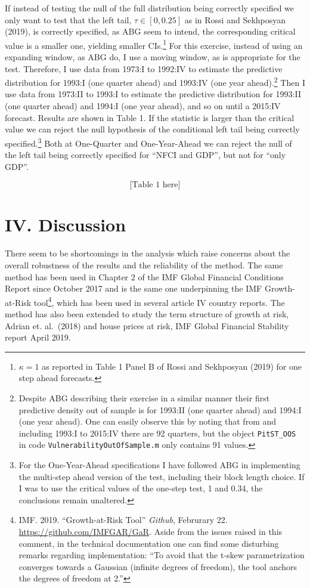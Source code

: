 \documentclass[
  11pt,
]{article}
\begin{document}
If instead of testing the null of the full distribution being correctly
specified we only want to test that the left tail,
\(\tau \in [0, 0.25]\) as in Rossi and Sekhposyan (2019), is correctly
specified, as ABG seem to intend, the corresponding critical value is a
smaller one, yielding smaller
CIs.\footnote{$\kappa = 1$  as reported in Table 1 Panel B of Rossi and Sekhposyan (2019) for one step ahead forecasts.}
For this exercise, instead of using an expanding window, as ABG do, I
use a moving window, as is appropriate for the test. Therefore, I use
data from 1973:I to 1992:IV to estimate the predictive distribution for
1993:I (one quarter ahead) and 1993:IV (one year
ahead).\footnote{Despite ABG describing their exercise in a similar manner their first predictive density out of sample is for 1993:II (one quarter ahead) and 1994:I (one year ahead). One can easily observe this by noting that from and including 1993:I to 2015:IV there are 92 quarters, but the object \texttt{PitST\_OOS} in code \texttt{VulnerabilityOutOfSample.m} only contains 91 values.}
Then I use data from 1973:II to 1993:I to estimate the predictive
distribution for 1993:II (one quarter ahead) and 1994:I (one year
ahead), and so on until a 2015:IV forecast. Results are shown in Table
1. If the statistic is larger than the critical value we can reject the
null hypothesis of the conditional left tail being correctly
specified.\footnote{For the One-Year-Ahead specifications I have followed ABG in implementing the multi-step ahead version of the test, including their block length choice. If I was to use the critical values of the one-step test, 1 and 0.34, the conclusions remain unaltered.}
Both at One-Quarter and One-Year-Ahead we can reject the null of the
left tail being correctly specified for ``NFCI and GDP'', but not for
``only GDP''.

\[
\text{[Table 1 here]}
\]

\hypertarget{iv.-discussion}{%
\section{IV. Discussion}\label{iv.-discussion}}

There seem to be shortcomings in the analysis which raise concerns about
the overall robustness of the results and the reliability of the method.
The same method has been used in Chapter 2 of the IMF Global Financial
Conditions Report since October 2017 and is the same one underpinning
the IMF Growth-at-Risk
tool\footnote{IMF. 2019. “Growth-at-Risk Tool” \textit{Github}, Februrary 22. \url{https://github.com/IMFGAR/GaR}. Aside from the issues raised in this comment, in the technical documentation one can find some disturbing remarks regarding implementation: “To avoid that the t-skew parametrization converges towards a Gaussian (infinite degrees of freedom), the tool anchors the degrees of freedom at 2.”},
which has been used in several article IV country reports. The method
has also been extended to study the term structure of growth at risk,
Adrian et. al.~(2018) and house prices at risk, IMF Global Financial
Stability report April 2019.
\end{document}
